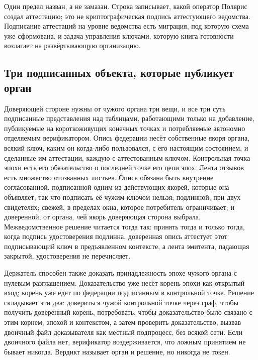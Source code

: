 Один предел назван, а не замазан. Строка записывает, какой оператор Полярис создал аттестацию; это
не криптографическая подпись аттестующего ведомства. Подписание аттестаций на уровне ведомства есть
миграция, под которую схема уже сформована, и задача управления ключами, которую книга готовности
возлагает на развёртывающую организацию. \sExt


\subsection{Три подписанных объекта, которые публикует орган}

Доверяющей стороне нужны от чужого органа три вещи, и все три суть подписанные представления над
таблицами, работающими только на добавление, публикуемые на короткоживущих конечных точках и
потребляемые автономно отделяемым верификатором. Опись федерации несёт собственные якоря органа,
всякий ключ, каким он когда-либо пользовался, с его настоящим состоянием, и сделанные им
аттестации, каждую с аттестованным ключом. Контрольная точка эпохи есть его обязательство о
последней точке его цепи эпох. Лента отзывов есть множество отозванных листьев. Опись обязана быть
внутренне согласованной, подписанной одним из действующих якорей, которые она объявляет, так что
подписать её чужим ключом нельзя; подлинной, при двух свидетелях; свежей, в пределах окна, которое
потребитель ограничивает; и доверенной, от органа, чей якорь доверяющая сторона выбрала.
Межведомственное решение читается тогда так: принять тогда и только тогда, когда подпись
удостоверения подлинна, доверенная опись аттестует этот подписывающий ключ в предъявленном
контексте, а лента эмитента, падающая закрытой, удостоверения не перечисляет. \sImpl

Держатель способен также доказать принадлежность эпохе чужого органа с нулевым разглашением.
Доказательство уже несёт корень эпохи как открытый вход; корень уже едет по федерации подписанным
в контрольной точке. Решение складывает эти два: довериться чужой контрольной точке через граф,
чтобы получить доверенный корень, потребовать, чтобы доказательство было связано с этим корнем,
эпохой и контекстом, а затем проверить доказательство, вызвав двоичный файл доказывателя как
местный подпроцесс, без всякой сети. Если двоичного файла нет, верификатор воздерживается, что
ложным принятием не бывает никогда. Вердикт называет орган и решение, но никогда не токен. \sImpl

